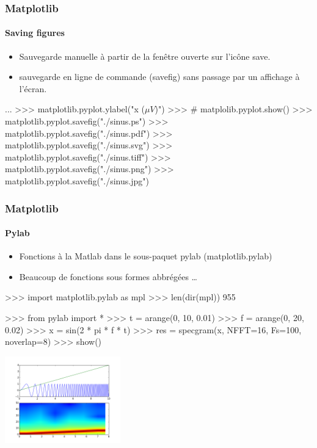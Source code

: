 \begin{frame}[fragile]
\frametitle{Matplotlib}
\framesubtitle{Saving figures}
\begin{itemize}
 \item Sauvegarde manuelle à partir de la fenêtre ouverte sur l'icône save.  
 \item sauvegarde en ligne de commande (savefig) sans passage par un affichage à l'écran.  
\end{itemize}
\begin{pythonConsole}
...
>>> matplotlib.pyplot.ylabel("x ($\mu V$)")
>>> # matplolib.pyplot.show()
>>> matplotlib.pyplot.savefig("./sinus.ps")
>>> matplotlib.pyplot.savefig("./sinus.pdf")
>>> matplotlib.pyplot.savefig("./sinus.svg")
>>> matplotlib.pyplot.savefig("./sinus.tiff")
>>> matplotlib.pyplot.savefig("./sinus.png")
>>> matplotlib.pyplot.savefig("./sinus.jpg")
\end{pythonConsole}
\end{frame}
\begin{frame}[fragile]
\frametitle{Matplotlib}
\framesubtitle{Pylab}
\begin{itemize}
 \item Fonctions à la Matlab dans le sous-paquet pylab (matplotlib.pylab)
 \item Beaucoup de fonctions sous formes abbrégées \dots
\end{itemize}
\begin{minipage}[c]{5cm}
\begin{pythonConsole}
>>> import matplotlib.pylab as mpl
>>> len(dir(mpl))
955

>>> from pylab import *
>>> t = arange(0, 10, 0.01)
>>> f = arange(0, 20, 0.02)
>>> x = sin(2 * pi * f * t)
>>> res = specgram(x, NFFT=16, Fs=100, noverlap=8)
>>> show()
\end{pythonConsole}
\end{minipage}
\begin{minipage}[c]{5cm}
 \includegraphics[width=5cm]{./fig/specgram.png}
\end{minipage}
\end{frame}
